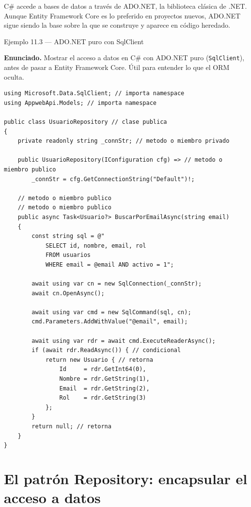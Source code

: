 C\# accede a bases de datos a través de ADO.NET, la
biblioteca clásica de .NET. Aunque Entity Framework Core es lo
preferido en proyectos nuevos, ADO.NET sigue siendo la base sobre
la que se construye y aparece en código heredado.


\begin{cajaejemplo}{Ejemplo 11.3 --- ADO.NET puro con SqlClient}

\textbf{Enunciado.} Mostrar el acceso a datos en C\# con ADO.NET puro (\texttt{SqlClient}), antes de pasar a Entity Framework Core. Útil para entender lo que el ORM oculta.

\begin{lstlisting}[style=cs,caption={UsuarioRepository.cs},label=lst:11.6]
using Microsoft.Data.SqlClient; // importa namespace
using AppwebApi.Models; // importa namespace

public class UsuarioRepository // clase publica
{
    private readonly string _connStr; // metodo o miembro privado

    public UsuarioRepository(IConfiguration cfg) => // metodo o miembro publico
        _connStr = cfg.GetConnectionString("Default")!;

    // metodo o miembro publico
    // metodo o miembro publico
    public async Task<Usuario?> BuscarPorEmailAsync(string email)
    {
        const string sql = @"
            SELECT id, nombre, email, rol
            FROM usuarios
            WHERE email = @email AND activo = 1";

        await using var cn = new SqlConnection(_connStr);
        await cn.OpenAsync();

        await using var cmd = new SqlCommand(sql, cn);
        cmd.Parameters.AddWithValue("@email", email);

        await using var rdr = await cmd.ExecuteReaderAsync();
        if (await rdr.ReadAsync()) { // condicional
            return new Usuario { // retorna
                Id     = rdr.GetInt64(0),
                Nombre = rdr.GetString(1),
                Email  = rdr.GetString(2),
                Rol    = rdr.GetString(3)
            };
        }
        return null; // retorna
    }
}
\end{lstlisting}
\end{cajaejemplo}

\section{El patrón Repository: encapsular el acceso a datos}

